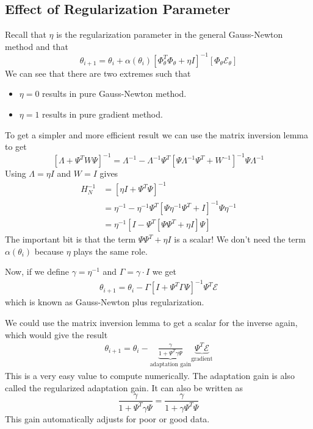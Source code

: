 \subsection{Effect of Regularization Parameter}
Recall that $\eta$ is the regularization parameter in the general Gauss-Newton method and that
$$\theta_{i+1} = \theta_i+\alpha(\theta_i)\left[\Phi_\theta^T\Phi_\theta + \eta I\right]^{-1}\left[\Phi_\theta\mathcal{E}_\theta\right]$$
We can see that there are two extremes such that
\begin{itemize}
\item $\eta=0$ results in pure Gauss-Newton method.
\item $\eta=1$ results in pure gradient method.
\end{itemize}
To get a simpler and more efficient result we can use the matrix inversion lemma to get
$$\left[\Lambda+\Psi^TW\Psi\right]^{-1} = \Lambda^{-1} - \Lambda^{-1}\Psi^T\left[\Psi\Lambda^{-1}\Psi^T + W^{-1}\right]^{-1}\Psi\Lambda^{-1}$$
Using $\Lambda=\eta I$ and $W=I$ gives
\begin{align*}
H_N^{-1} &= \left[\eta I + \Psi^T\Psi\right]^{-1} \\
&= \eta^{-1}-\eta^{-1}\Psi^T\left[\Psi\eta^{-1}\Psi^T+I\right]^{-1}\Psi\eta^{-1} \\
&= \eta^{-1}\left[I-\Psi^T\left[\Psi\Psi^T+\eta I\right]\Psi\right]
\end{align*}
The important bit is that the term $\Psi\Psi^T+\eta I$ is a scalar! We don't need the term $\alpha(\theta_i)$ because $\eta$ plays the same role.

Now, if we define $\gamma=\eta^{-1}$ and $\Gamma=\gamma\cdot I$ we get
\begin{align*}
\boxed{\theta_{i+1} = \theta_i - \Gamma\left[I+\Psi^T\Gamma\Psi\right]^{-1}\Psi^T\mathcal{E}}
\end{align*}
which is known as Gauss-Newton plus regularization.

We could use the matrix inversion lemma to get a scalar for the inverse again, which would give the result
\begin{align*}
\boxed{\theta_{i+1} = \theta_i - \underbrace{\frac{\gamma}{1+\Psi^T\gamma\Psi}}_{\text{adaptation gain}}\underbrace{\Psi^T\mathcal{E}}_{\text{gradient}}}
\end{align*}
This is a very easy value to compute numerically. The adaptation gain is also called the regularized adaptation gain. It can also be written as
$$\frac{\gamma}{1+\Psi^T\gamma\Psi} = \frac{\gamma}{1+\gamma\Psi^T\Psi}$$
This gain automatically adjusts for poor or good data.

